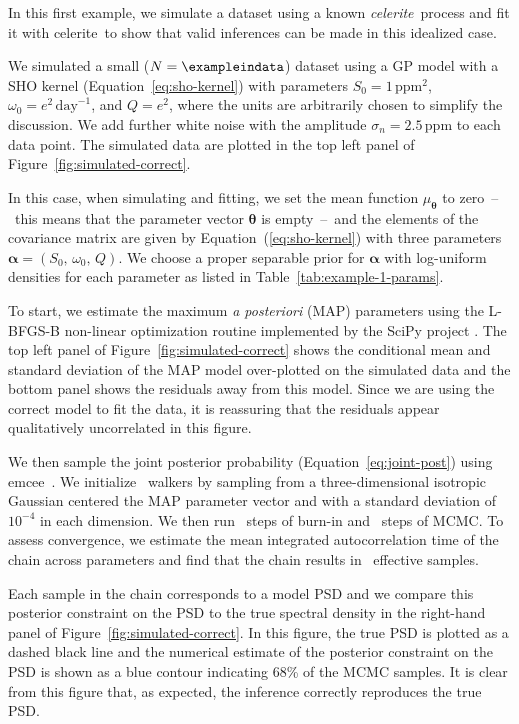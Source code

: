 \documentclass[manuscript, letterpaper]{aastex6}
\makeatletter
\let\origsubsection\subsection
\renewcommand\subsection{\@ifstar{\starsubsection}{\nostarsubsection}}
\newcommand\nostarsubsection[1]{\subsectionprelude\origsubsection{#1}}
\newcommand\starsubsection[1]{\subsectionprelude\origsubsection*{#1}}
\newcommand\subsectionprelude{\vspace{1em}}
\newcommand{\project}[1]{\textsf{#1}}
\newcommand{\celerite}{\project{celerite}}
\newcommand{\celeriteterm}{\emph{celerite}}
\newcommand{\emcee}{\project{emcee}}
\newcommand{\figureref}[1]{\ref{fig:#1}}
\newcommand{\Figure}[1]{Figure~\figureref{#1}}
\renewcommand{\eqref}[1]{\ref{eq:#1}}
\newcommand{\Eq}[1]{Equation~(\eqref{#1})}
\newcommand{\eq}[1]{\Eq{#1}}
\newcommand{\eqalt}[1]{Equation~\eqref{#1}}
\newcommand{\sectlabel}[1]{\label{sect:#1}}
\newcommand{\bvec}[1]{{\ensuremath{\boldsymbol{#1}}}}
\newcommand{\response}[1]{{\color{blue}#1}}
\makeatother
\begin{document}
\subsection{Example 1: Recovery of a celerite process}\sectlabel{example1}

In this first example, we simulate a dataset using a known \celeriteterm\
process and fit it with \celerite\ to show that valid inferences can be made
in this idealized case.
\response{We simulated a small ($N = \exampleindata$) dataset using a GP model
with a SHO kernel (\eqalt{sho-kernel}) with parameters $S_0 =
1\,\mathrm{ppm}^2$, $\omega_0 = e^2\,\mathrm{day}^{-1}$, and $Q = e^2$, where
the units are arbitrarily chosen to simplify the discussion.
We add further white noise with the amplitude $\sigma_n = 2.5\, \mathrm{ppm}$
to each data point.
The simulated data are plotted in the top left panel of
\Figure{simulated-correct}.

In this case, when simulating and fitting, we set the mean function
$\mu_\bvec{\theta}$ to zero~--~this means that the parameter vector
$\bvec{\theta}$ is empty~--~and the elements of the covariance matrix are
given by \eq{sho-kernel} with three parameters $\bvec{\alpha} = (S_0,\,
\omega_0,\,Q)$.
We choose a proper separable prior for $\bvec{\alpha}$ with log-uniform
densities for each parameter as listed in Table~\ref{tab:example-1-params}.

To start, we estimate the maximum \emph{a posteriori} (MAP) parameters using
the \project{L-BFGS-B} non-linear optimization routine \citep{Byrd:1995,
Zhu:1997} implemented by the \project{SciPy} project \citep{Jones:2001}.
The top left panel of \Figure{simulated-correct} shows the conditional mean
and standard deviation of the MAP model over-plotted on the simulated data and
the bottom panel shows the residuals away from this model.
Since we are using the correct model to fit the data, it is reassuring that
the residuals appear qualitatively uncorrelated in this figure.

We then sample the joint posterior probability (\eqalt{joint-post}) using
\emcee\ \citep{Goodman:2010, Foreman-Mackey:2013}.
We initialize \exampleinwalkers~walkers by sampling from a three-dimensional
isotropic Gaussian centered the MAP parameter vector and with a standard
deviation of $10^{-4}$ in each dimension.
We then run \exampleinburn~steps of burn-in and \exampleinsteps~steps of MCMC.
To assess convergence, we estimate the mean integrated autocorrelation time of
the chain across parameters \citep{Sokal:1989, Goodman:2010} and find that the
chain results in \exampleineff~effective samples.

Each sample in the chain corresponds to a model PSD and we compare this
posterior constraint on the PSD to the true spectral density in the
right-hand panel of \Figure{simulated-correct}.
In this figure, the true PSD is plotted as a dashed black line and the
numerical estimate of the posterior constraint on the PSD is shown as a blue
contour indicating 68\% of the MCMC samples.
It is clear from this figure that, as expected, the inference correctly
reproduces the true PSD.
}
\end{document}
